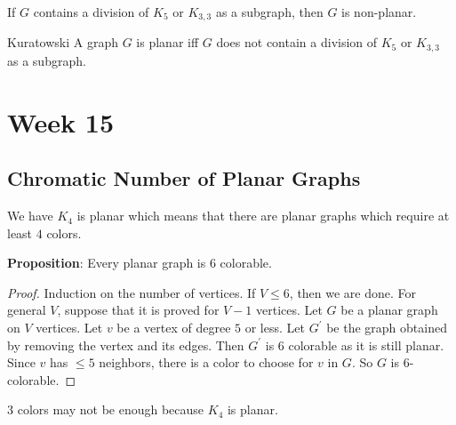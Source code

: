 \documentclass{report}
\begin{document}
If $G$ contains a division of $K_{5}$ or $K_{3,3}$ as a subgraph, then $G$ is non-planar. 

\begin{theorem}{Kuratowski}
    A graph $G$ is planar iff $G$ does not contain a division of $K_{5}$ or $K_{3, 3}$ as a subgraph.
\end{theorem}

\chapter{Week 15}

\begin{topic}
    \section{Chromatic Number of Planar Graphs}
\end{topic}

We have $K_{4}$ is planar which means that there are planar graphs which require at least $4$ colors.

\textbf{Proposition}: Every planar graph is $6$ colorable.
    \begin{proof}
        Induction on the number of vertices. If $V \leq 6$, then we are done. For general $V$, suppose that it is proved for $V - 1$ vertices. Let $G$ be a planar graph on $V$ vertices. Let $v$ be a vertex of degree $5$ or less. Let $G^{\prime}$ be the graph obtained by removing the vertex and its edges. Then $G^{\prime}$ is $6$ colorable as it is still planar. Since $v$ has $\leq 5$ neighbors, there is a color to choose for $v$ in $G$. So $G$ is $6$-colorable.
    \end{proof}

$3$ colors may not be enough because $K_{4}$ is planar.
\end{document}
